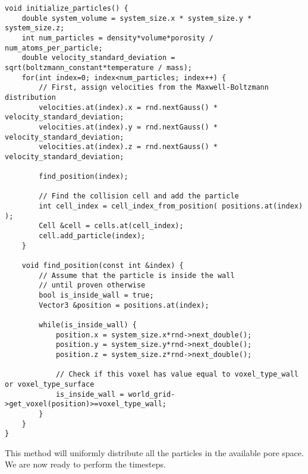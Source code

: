 \begin{lstlisting}[caption=Particle initialization., label=lst:dsmc_initialize_particles]
void initialize_particles() {
	double system_volume = system_size.x * system_size.y * system_size.z;
	int num_particles = density*volume*porosity / num_atoms_per_particle;
	double velocity_standard_deviation = sqrt(boltzmann_constant*temperature / mass);
	for(int index=0; index<num_particles; index++) {
		// First, assign velocities from the Maxwell-Boltzmann distribution
		velocities.at(index).x = rnd.nextGauss() * velocity_standard_deviation;
		velocities.at(index).y = rnd.nextGauss() * velocity_standard_deviation;
		velocities.at(index).z = rnd.nextGauss() * velocity_standard_deviation;

		find_position(index);

		// Find the collision cell and add the particle
		int cell_index = cell_index_from_position( positions.at(index) );
		Cell &cell = cells.at(cell_index);
        cell.add_particle(index);
	}

	void find_position(const int &index) {
		// Assume that the particle is inside the wall
		// until proven otherwise
	    bool is_inside_wall = true;
	    Vector3 &position = positions.at(index);
	    
	    while(is_inside_wall) {
	        position.x = system_size.x*rnd->next_double();
	        position.y = system_size.y*rnd->next_double();
	        position.z = system_size.z*rnd->next_double();

	        // Check if this voxel has value equal to voxel_type_wall or voxel_type_surface
	        is_inside_wall = world_grid->get_voxel(position)>=voxel_type_wall;
	    }
	}
}
\end{lstlisting}
This method will uniformly distribute all the particles in the available pore space. We are now ready to perform the timesteps.